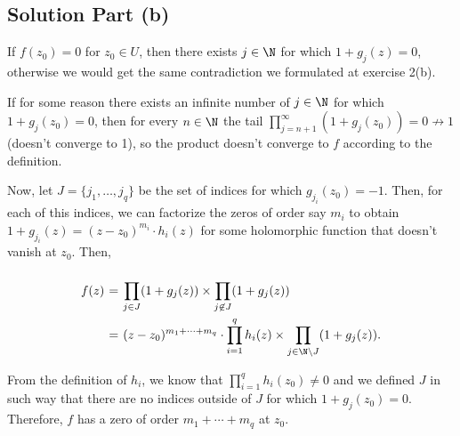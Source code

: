 \subsection*{Solution Part (b)}

If $f(z_0) = 0$ for $z_0 \in U$, then there exists $j \in \N$ for which $1+g_j(z) = 0$, otherwise we would get the same contradiction we formulated at exercise 2(b).

If for some reason there exists an infinite number of $j\in \N$ for which $1+g_j(z_0) = 0$, then for every $n\in \N$ the tail $\prod_{j = n+1}^{\infty} (1+g_j(z_0)) = 0 \not\to 1$ (doesn't converge to 1), so the product doesn't converge to $f$ according to the definition.


Now, let $J = \{j_1,\ldots, j_q\}$ be the set of indices for which $g_{j_i}(z_0) = -1$. Then, for each of this indices, we can factorize the zeros of order say $m_i$ to obtain $1+g_{j_i}(z) = (z-z_0)^{m_i}\cdot h_i(z)$ for some holomorphic function that doesn't vanish at $z_0$. Then,
\[ \everymath{\displaystyle}
\arraycolsep=1.8pt\def\arraystretch{2.5}
\begin{array}{rcl}
    f(z) & = & \prod_{j\in J} (1+g_j(z)) \times \prod_{j\not\in J} (1+g_j(z))\\
    & = & (z-z_0)^{m_1+\cdots+m_q}\cdot \prod_{i = 1}^q h_i(z) \times \prod_{j\in \N\backslash J} (1+g_j(z)).
\end{array}\]

From the definition of $h_i$, we know that $\prod_{i = 1}^q h_i(z_0) \neq 0$ and we defined $J$ in such way that there are no indices outside of $J$ for which $1+g_j(z_0) = 0$. Therefore, $f$ has a zero of order $m_1+\cdots+m_q$ at $z_0$.